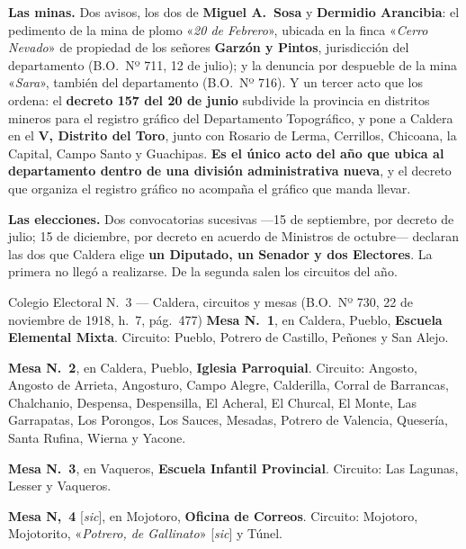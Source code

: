 \textbf{Las minas.} Dos avisos, los dos de \textbf{Miguel A.\ Sosa} y \textbf{Dermidio
Arancibia}: el pedimento de la mina de plomo «\textit{20 de Febrero}», ubicada en la finca
«\textit{Cerro Nevado}» de propiedad de los señores \textbf{Garzón y Pintos}, jurisdicción del
departamento (B.O.\ Nº 711, 12 de julio); y la denuncia por despueble de la mina
«\textit{Sara}», también del departamento (B.O.\ Nº 716). Y un tercer acto que los ordena: el
\textbf{decreto 157 del 20 de junio} subdivide la provincia en distritos mineros para el registro
gráfico del Departamento Topográfico, y pone a Caldera en el \textbf{V, Distrito del Toro}, junto
con Rosario de Lerma, Cerrillos, Chicoana, la Capital, Campo Santo y Guachipas. \textbf{Es el
único acto del año que ubica al departamento dentro de una división administrativa nueva}, y el
decreto que organiza el registro gráfico no acompaña el gráfico que manda llevar.

\textbf{Las elecciones.} Dos convocatorias sucesivas ---15 de septiembre, por decreto de julio;
15 de diciembre, por decreto en acuerdo de Ministros de octubre--- declaran las dos que Caldera
elige \textbf{un Diputado, un Senador y dos Electores}. La primera no llegó a realizarse. De la
segunda salen los circuitos del año.

\begin{ficha}{Colegio Electoral N.\ 3 --- Caldera, circuitos y mesas (B.O.\ Nº 730, 22 de noviembre de 1918, h.\ 7, pág.\ 477)}
\textbf{Mesa N.\ 1}, en Caldera, Pueblo, \textbf{Escuela Elemental Mixta}. Circuito: Pueblo,
Potrero de Castillo, Peñones y San Alejo.

\textbf{Mesa N.\ 2}, en Caldera, Pueblo, \textbf{Iglesia Parroquial}. Circuito: Angosto, Angosto
de Arrieta, Angosturo, Campo Alegre, Calderilla, Corral de Barrancas, Chalchanio, Despensa,
Despensilla, El Acheral, El Churcal, El Monte, Las Garrapatas, Los Porongos, Los Sauces, Mesadas,
Potrero de Valencia, Quesería, Santa Rufina, Wierna y Yacone.

\textbf{Mesa N.\ 3}, en Vaqueros, \textbf{Escuela Infantil Provincial}. Circuito: Las Lagunas,
Lesser y Vaqueros.

\textbf{Mesa N,\ 4} [\textit{sic}], en Mojotoro, \textbf{Oficina de Correos}. Circuito: Mojotoro,
Mojotorito, «\textit{Potrero, de Gallinato}» [\textit{sic}] y Túnel.
\end{ficha}

